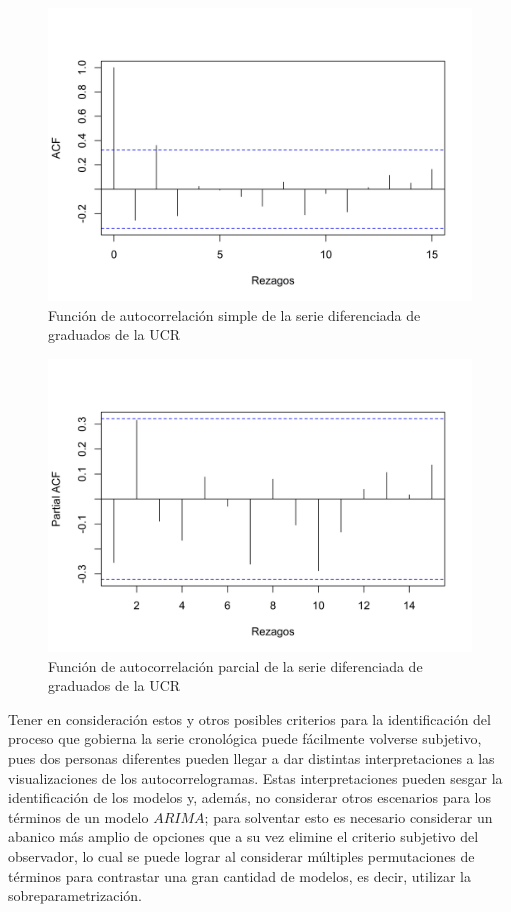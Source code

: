 \documentclass[
]{article}
\begin{document}
\begin{figure}[H]
\includegraphics[width=1\linewidth,height=1\textheight]{Tesis_files/figure-latex/auto_ucr2-1} \caption{Función de autocorrelación simple de la serie diferenciada de graduados de la UCR}\label{fig:auto_ucr2}
\end{figure}

\begin{figure}[H]
\includegraphics[width=1\linewidth,height=1\textheight]{Tesis_files/figure-latex/parcial_ucr2-1} \caption{Función de autocorrelación parcial de la serie diferenciada de graduados de la UCR}\label{fig:parcial_ucr2}
\end{figure}

Tener en consideración estos y otros posibles criterios para la
identificación del proceso que gobierna la serie cronológica puede
fácilmente volverse subjetivo, pues dos personas diferentes pueden
llegar a dar distintas interpretaciones a las visualizaciones de los
autocorrelogramas. Estas interpretaciones pueden sesgar la
identificación de los modelos y, además, no considerar otros escenarios
para los términos de un modelo \(ARIMA\); para solventar esto es
necesario considerar un abanico más amplio de opciones que a su vez
elimine el criterio subjetivo del observador, lo cual se puede lograr al
considerar múltiples permutaciones de términos para contrastar una gran
cantidad de modelos, es decir, utilizar la sobreparametrización.
\end{document}
